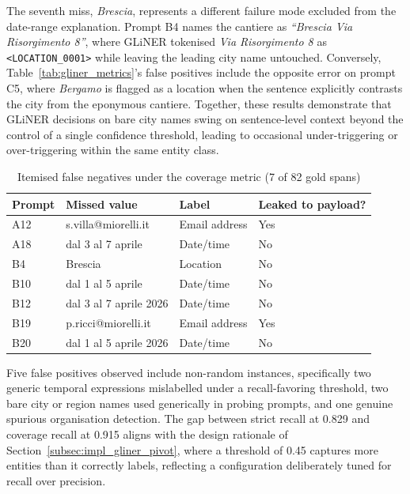 The seventh miss, \emph{Brescia}, represents a different failure mode excluded from the date-range explanation. Prompt B4 names the cantiere as \emph{``Brescia Via Risorgimento 8''}, where GLiNER tokenised \emph{Via Risorgimento 8} as \texttt{<LOCATION\_0001>} while leaving the leading city name untouched. Conversely, Table~\ref{tab:gliner_metrics}'s false positives include the opposite error on prompt C5, where \emph{Bergamo} is flagged as a location when the sentence explicitly contrasts the city from the eponymous cantiere. Together, these results demonstrate that GLiNER decisions on bare city names swing on sentence-level context beyond the control of a single confidence threshold, leading to occasional under-triggering or over-triggering within the same entity class.

\begin{table}[htbp]
\centering
\caption{Itemised false negatives under the coverage metric (7 of 82 gold spans)}
\label{tab:gliner_fn}
\begin{tabular}{l p{5cm} l p{2.6cm}}
\hline
\textbf{Prompt} & \textbf{Missed value} & \textbf{Label} & \textbf{Leaked to payload?} \\
\hline
A12 & s.villa@miorelli.it & Email address & Yes \\
A18 & dal 3 al 7 aprile & Date/time & No \\
B4 & Brescia & Location & No \\
B10 & dal 1 al 5 aprile & Date/time & No \\
B12 & dal 3 al 7 aprile 2026 & Date/time & No \\
B19 & p.ricci@miorelli.it & Email address & Yes \\
B20 & dal 1 al 5 aprile 2026 & Date/time & No \\
\hline
\end{tabular}
\end{table}

Five false positives observed include non-random instances, specifically two generic temporal expressions mislabelled under a recall-favoring threshold, two bare city or region names used generically in probing prompts, and one genuine spurious organisation detection. The gap between strict recall at 0.829 and coverage recall at 0.915 aligns with the design rationale of Section~\ref{subsec:impl_gliner_pivot}, where a threshold of 0.45 captures more entities than it correctly labels, reflecting a configuration deliberately tuned for recall over precision.

